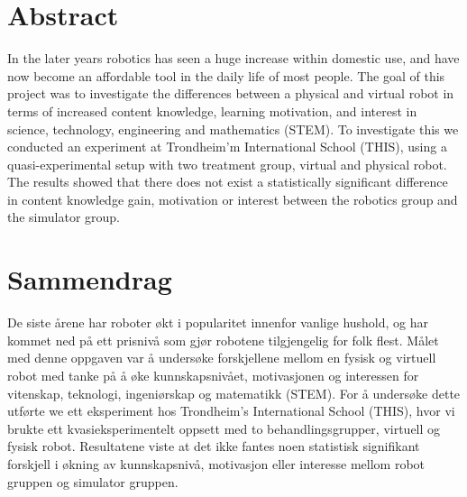 \section*{Abstract}
In the later years robotics has seen a huge increase within domestic use, and have now become an affordable tool in the daily life of most people.
The goal of this project was to investigate the differences between a physical and virtual robot in terms of increased content knowledge, learning motivation, and interest in science, technology, engineering and mathematics (STEM).
To investigate this we conducted an experiment at Trondheim'm International School (THIS), using a quasi-experimental setup with two treatment group, virtual and physical robot. 
The results showed that there does not exist a statistically significant difference in content knowledge gain, motivation or interest between the robotics group and the simulator group. 

\newpage
\section*{Sammendrag}
 De siste årene har roboter økt i popularitet innenfor vanlige hushold, og har kommet ned på ett prisnivå som gjør robotene tilgjengelig for folk flest.
Målet med denne oppgaven var å undersøke forskjellene mellom en fysisk og virtuell robot med tanke på å øke kunnskapsnivået, motivasjonen og interessen for vitenskap, teknologi, ingeniørskap og matematikk (STEM).
For å undersøke dette utførte we ett eksperiment hos Trondheim's International School (THIS), hvor vi brukte ett kvasieksperimentelt oppsett med to behandlingsgrupper, virtuell og fysisk robot.
Resultatene viste at det ikke fantes noen statistisk signifikant forskjell i økning av kunnskapsnivå, motivasjon eller interesse mellom robot gruppen og simulator gruppen.